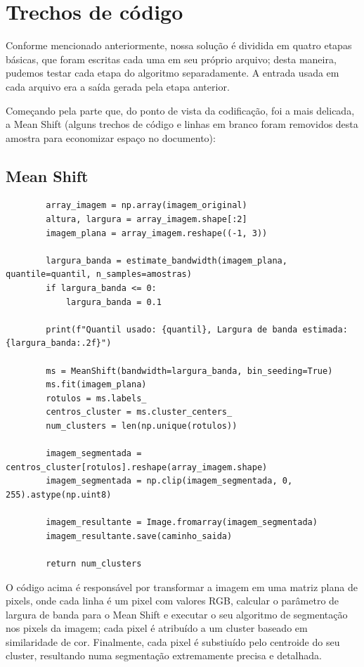 \documentclass{article}
\begin{document}
\section{Trechos de código}

Conforme mencionado anteriormente, nossa solução é dividida em quatro etapas básicas, que foram escritas cada uma em seu próprio arquivo; desta maneira, pudemos testar cada etapa do algoritmo separadamente. A entrada usada em cada arquivo era a saída gerada pela etapa anterior.

Começando pela parte que, do ponto de vista da codificação, foi a mais delicada, a Mean Shift (alguns trechos de código e linhas em branco foram removidos desta amostra para economizar espaço no documento):

\subsection{Mean Shift}

\begin{verbatim}
        array_imagem = np.array(imagem_original)
        altura, largura = array_imagem.shape[:2]
        imagem_plana = array_imagem.reshape((-1, 3))

        largura_banda = estimate_bandwidth(imagem_plana, quantile=quantil, n_samples=amostras)
        if largura_banda <= 0:
            largura_banda = 0.1

        print(f"Quantil usado: {quantil}, Largura de banda estimada: {largura_banda:.2f}")

        ms = MeanShift(bandwidth=largura_banda, bin_seeding=True)
        ms.fit(imagem_plana)
        rotulos = ms.labels_
        centros_cluster = ms.cluster_centers_
        num_clusters = len(np.unique(rotulos))

        imagem_segmentada = centros_cluster[rotulos].reshape(array_imagem.shape)
        imagem_segmentada = np.clip(imagem_segmentada, 0, 255).astype(np.uint8)

        imagem_resultante = Image.fromarray(imagem_segmentada)
        imagem_resultante.save(caminho_saida)

        return num_clusters
\end{verbatim}

O código acima é responsável por transformar a imagem em uma matriz plana de pixels, onde cada linha é um pixel com valores RGB, calcular o parâmetro de largura de banda para o Mean Shift e executar o seu algoritmo de segmentação nos pixels da imagem; cada pixel é atribuído a um cluster baseado em similaridade de cor. Finalmente, cada pixel é substiuído pelo centroide do seu cluster, resultando numa segmentação extremamente precisa e detalhada.
\end{document}
